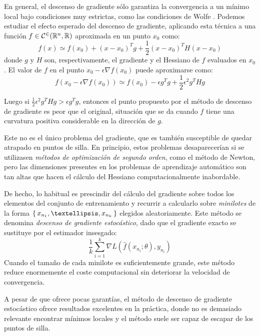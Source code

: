 En general, el descenso de gradiente sólo garantiza la convergencia a un mínimo local bajo condiciones muy estrictas, como las condiciones de Wolfe \cite{nocedal2006}. Podemos estudiar el efecto esperado del descenso de gradiente, aplicando esta técnica a una función \( f \in \mathcal{C^2}(\mathbb{R}^{n}, \mathbb{R}) \) aproximada en un punto \( x_{0} \) como:
\[
    f(x) \simeq f(x_{0}) + (x - x_{0})^T g + \frac{1}{2} (x - x_{0})^T H (x-x_{0})
\]
donde \( g \) y \( H \) son, respectivamente, el gradiente y  el Hessiano de \( f \) evaluados en \( x_{0} \). El valor de \( f \) en el punto \( x_{0} - \epsilon \nabla f(x_0) \) puede aproximarse como:
\begin{equation}\label{eq:descent}
    f \left( x_{0} - \epsilon \nabla f(x_{0}) \right) \simeq f(x_{0}) - \epsilon g^T g +  \frac{1}{2} \epsilon^2 g^T Hg
\end{equation}

Luego si \( \frac{1}{2} \epsilon^2 g^T Hg > \epsilon g^T g \), entonces el punto propuesto por el método de descenso de gradiente es peor que el original, situación que se da cuando \( f \) tiene una curvatura positiva considerable en la dirección de \( g \). 

Este no es el único problema del gradiente, que es también susceptible de quedar atrapado en puntos de silla. En principio, estos problemas desaparecerían si se utilizasen \textit{métodos de optimización de segundo orden}, como el método de Newton, pero las dimensiones presentes en los problemas de aprendizaje automático son tan altas que hacen el cálculo del Hessiano computacionalmente inabordable.

De hecho, lo habitual es prescindir del cálculo del gradiente sobre todos los elementos del conjunto de entrenamiento y recurrir a calcularlo sobre \textit{minilotes} de la forma \( \Set{ x_{n_1}, …, x_{n_k} } \) elegidos aleatoriamente. Este método se denomina \textit{descenso de gradiente estocástico}, dado que el gradiente exacto se sustituye por el estimador insesgado: \[
    \frac{1}{k} \sum_{i = 1}^k \nabla L\left( \widehat{f}(x_{n_i}; \theta), y_{n_i} \right) 
\]
Cuando el tamaño de cada minilote es suficientemente grande, este método reduce enormemente el coste computacional sin deteriorar la velocidad de convergencia.

A pesar de que ofrece pocas garantías, el método de descenso de gradiente estocástico ofrece resultados excelentes en la práctica, donde no es demasiado relevante encontrar mínimos locales y el método suele ser capaz de escapar de los puntos de silla. 

